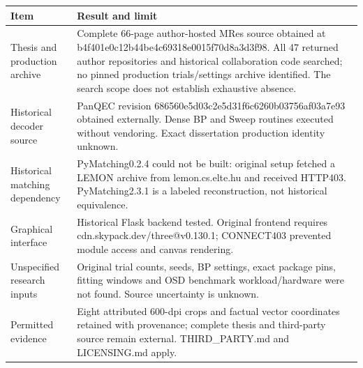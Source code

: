 \begin{longtable}{p{.23\linewidth}p{.69\linewidth}}
\toprule Item & Result and limit\\\midrule\endhead
Thesis and production archive & Complete 66-page author-hosted MRes source obtained at b4f401e0c12b44be4c69318e0015f70d8a3d3f98. All 47 returned author repositories and historical collaboration code searched; no pinned production trials/settings archive identified. The search scope does not establish exhaustive absence.\\
Historical decoder source & PanQEC revision 686560e5d03c2e5d31f6c6260b03756af03a7e93 obtained externally. Dense BP and Sweep routines executed without vendoring. Exact dissertation production identity unknown.\\
Historical matching dependency & PyMatching0.2.4 could not be built: original setup fetched a LEMON archive from lemon.cs.elte.hu and received HTTP403. PyMatching2.3.1 is a labeled reconstruction, not historical equivalence.\\
Graphical interface & Historical Flask backend tested. Original frontend requires cdn.skypack.dev/three@v0.130.1; CONNECT403 prevented module access and canvas rendering.\\
Unspecified research inputs & Original trial counts, seeds, BP settings, exact package pins, fitting windows and OSD benchmark workload/hardware were not found. Source uncertainty is unknown.\\
Permitted evidence & Eight attributed 600-dpi crops and factual vector coordinates retained with provenance; complete thesis and third-party source remain external. THIRD\_PARTY.md and LICENSING.md apply.\\
\bottomrule\end{longtable}
